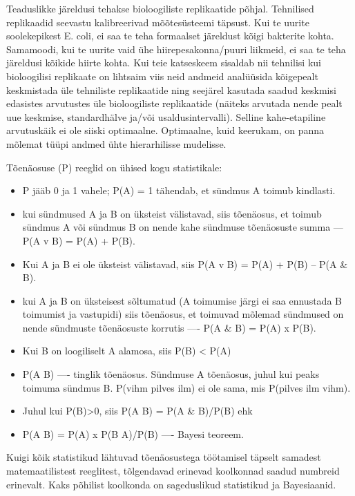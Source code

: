 \documentclass[]{book}
\providecommand{\tightlist}{%
  \setlength{\itemsep}{0pt}\setlength{\parskip}{0pt}}
\begin{document}
\begin{itemize}
  Teaduslikke järeldusi tehakse bioloogiliste replikaatide põhjal. Tehnilised replikaadid seevastu kalibreerivad mõõtesüsteemi täpsust. Kui te uurite soolekepikest E. coli, ei saa te teha formaalset järeldust kõigi bakterite kohta. Samamoodi, kui te uurite vaid ühe hiirepesakonna/puuri liikmeid, ei saa te teha järeldusi kõikide hiirte kohta. Kui teie katseskeem sisaldab nii tehnilisi kui bioloogilisi replikaate on lihtsaim viis neid andmeid analüüsida kõigepealt keskmistada üle tehniliste replikaatide ning seejärel kasutada saadud keskmisi edasistes arvutustes üle bioloogiliste replikaatide (näiteks arvutada nende pealt uue keskmise, standardhälve ja/või usaldusintervalli). Selline kahe-etapiline arvutuskäik ei ole siiski optimaalne. Optimaalne, kuid keerukam, on panna mõlemat tüüpi andmed ühte hierarhilisse mudelisse.
\end{itemize}

Tõenäosuse (P) reeglid on ühised kogu statistikale:

\begin{itemize}
\tightlist
\item
  P jääb 0 ja 1 vahele; P(A) = 1 tähendab, et sündmus A toimub kindlasti.
\item
  kui sündmused A ja B on üksteist välistavad, siis tõenäosus, et toimub sündmus A või sündmus B on nende kahe sündmuse tõenäosuste summa --- P(A v B) = P(A) + P(B).
\item
  Kui A ja B ei ole üksteist välistavad, siis P(A v B) = P(A) + P(B) -- P(A \& B).
\item
  kui A ja B on üksteisest sõltumatud (A toimumise järgi ei saa ennustada B toimumist ja vastupidi) siis tõenäosus, et toimuvad mõlemad sündmused on nende sündmuste tõenäosuste korrutis ---- P(A \& B) = P(A) x P(B).
\item
  Kui B on loogiliselt A alamosa, siis P(B) \textless{} P(A)
\item
  P(A \textbar{} B) ---- tinglik tõenäosus. Sündmuse A tõenäosus, juhul kui peaks toimuma sündmus B. P(vihm \textbar{} pilves ilm) ei ole sama, mis P(pilves ilm \textbar{} vihm).
\item
  Juhul kui P(B)\textgreater{}0, siis P(A \textbar{} B) = P(A \& B)/P(B) ehk
\item
  P(A \textbar{} B) = P(A) x P(B \textbar{} A)/P(B) ---- Bayesi teoreem.
\end{itemize}

Kuigi kõik statistikud lähtuvad tõenäosustega töötamisel täpselt samadest matemaatilistest reeglitest, tõlgendavad erinevad koolkonnad saadud numbreid erinevalt. Kaks põhilist koolkonda on sageduslikud statistikud ja Bayesiaanid.
\end{document}
